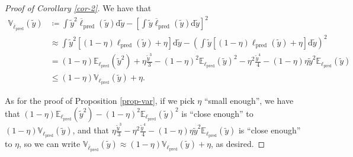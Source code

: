 \documentclass[12pt, english, oneside, a4paper]{article}
\begin{document}
\iffalse 
\begin{proof}[Proof of Corollary \ref{cor-2}]
    We have that
    \begin{align*}
        \mathbb{V}_{\overline{\ell}_\text{pred}}(\tilde{y}) &\coloneqq \int \tilde{y}^2 \overline{\ell}_\text{pred}(\tilde{y}) \text{d}\tilde{y} - \left[\int \tilde{y} \overline{\ell}_\text{pred}(\tilde{y}) \text{d}\tilde{y}\right]^2\\
        &\approx \int \tilde{y}^2 \left[ (1-\eta) {\ell}_\text{pred}(\tilde{y}) +\eta \right] \text{d}\tilde{y} - \left(\int \tilde{y} \left[(1-\eta) {\ell}_\text{pred}(\tilde{y}) + \eta \right] \text{d}\tilde{y}\right)^2\\
        &= (1-\eta) \mathbb{E}_{\ell_\text{pred}}(\tilde{y}^2) + \eta \frac{\tilde y ^3}{3} - (1-\eta)^2 \mathbb{E}_{\ell_\text{pred}}(\tilde{y})^2 -\eta^2 \frac{\tilde y ^4}{4} - (1-\eta) \eta \tilde{y}^2 \mathbb{E}_{\ell_\text{pred}}(\tilde{y})\\
        &\leq (1-\eta) \mathbb{V}_{{\ell}_\text{pred}}(\tilde{y}) + \eta.
    \end{align*}

As for the proof of Proposition \ref{prop-var}, if we pick $\eta$ ``small enough'', we have that $(1-\eta) \mathbb{E}_{\ell_\text{pred}}(\tilde{y}^2) - (1-\eta)^2 \mathbb{E}_{\ell_\text{pred}}(\tilde{y})^2$ is ``close enough'' to $(1-\eta) \mathbb{V}_{\ell_\text{pred}}(\tilde{y})$, and that $\eta \frac{\tilde y ^3}{3} -\eta^2 \frac{\tilde y ^4}{4} - (1-\eta) \eta \tilde{y}^2 \mathbb{E}_{\ell_\text{pred}}(\tilde{y})$ is ``close enough'' to $\eta$, so we can write $\mathbb{V}_{\overline{\ell}_\text{pred}}(\tilde{y}) \approx (1-\eta) \mathbb{V}_{{\ell}_\text{pred}}(\tilde{y}) + \eta$, as desired.
\end{proof}
\end{document}
